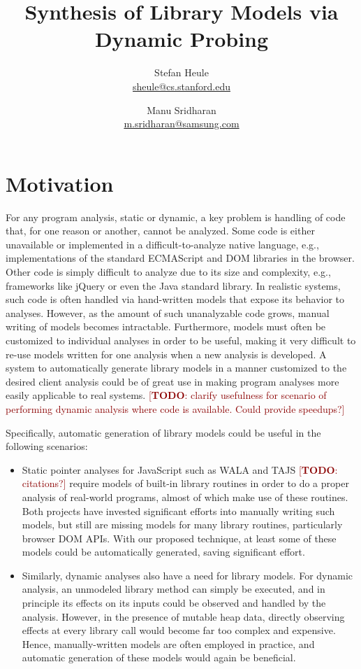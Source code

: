 \documentclass[]{article}
\title{Synthesis of Library Models via Dynamic Probing}
\author{
  Stefan Heule\\\url{sheule@cs.stanford.edu}
  \and
  Manu Sridharan\\\url{m.sridharan@samsung.com}
}
\newcommand{\todo}[1]{{\textcolor{DarkRed}{ [\textbf{TODO}: #1]}}}
\begin{document}
\maketitle



\section*{Motivation}

For any program analysis, static or dynamic, a key problem is handling of code
that, for one reason or another, cannot be analyzed.  Some code is either
unavailable or implemented in a difficult-to-analyze native language, e.g.,
implementations of the standard ECMAScript and DOM libraries in the browser.
Other code is simply difficult to analyze due to its size and complexity, e.g.,
frameworks like jQuery or even the Java standard library.  In realistic systems,
such code is often handled via hand-written models that expose its behavior to
analyses.  However, as the amount of such unanalyzable code grows, manual
writing of models becomes intractable. Furthermore, models must often be customized to
individual analyses in order to be useful, making it very difficult to re-use
models written for one analysis when a new analysis is developed.  A system to
automatically generate library models in a manner customized to the desired
client analysis could be of great use in making program analyses more easily
applicable to real systems.
\todo{clarify usefulness for scenario of performing
  dynamic analysis where code is available.  Could provide speedups?}

Specifically, automatic generation of library models could be useful in the following scenarios:
\begin{itemize}
\item Static pointer analyses for JavaScript such as WALA and TAJS
  \todo{citations?}  require models of built-in library routines in
  order to do a proper analysis of real-world programs, almost of
  which make use of these routines.  Both projects have invested
  significant efforts into manually writing such models, but still are
  missing models for many library routines, particularly browser DOM
  APIs.  With our proposed technique, at least some of these models
  could be automatically generated, saving significant effort.
\item Similarly, dynamic analyses also have a need for library models.
  For dynamic analysis, an unmodeled library method can simply be
  executed, and in principle its effects on its inputs could be
  observed and handled by the analysis.  However, in the presence of
  mutable heap data, directly observing effects at every library call
  would become far too complex and expensive.  Hence, manually-written
  models are often employed in practice, and automatic generation of
  these models would again be beneficial.
\end{itemize}
\end{document}
